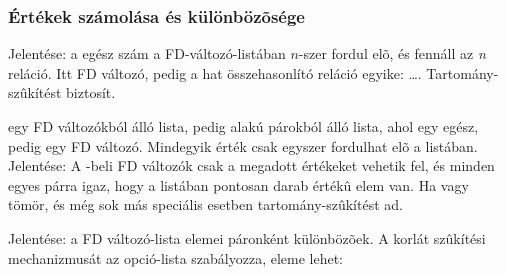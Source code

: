 \subsubsection{Értékek számolása és különbözõsége}

\medskip

{}

Jelentése: a  egész szám a  FD-változó-listában $n$-szer fordul elõ,
és fennáll az  {\it n}  reláció. Itt  FD változó,
 pedig a hat összehasonlító reláció egyike: \cd{\#=, \#\bs=, \#<} \ldots.
Tartomány-szûkítést biztosít.

\medskip

{}

 egy FD változókból álló lista,  pedig   alakú párokból
álló lista, ahol  egy egész,  pedig egy FD változó. Mindegyik 
érték csak egyszer fordulhat elõ a  listában. Jelentése: A -beli
FD változók csak a megadott  értékeket vehetik fel, és minden egyes 
párra igaz, hogy a  listában pontosan  darab  értékû elem van.
Ha  vagy  tömör, és még sok más speciális esetben tartomány-szûkítést
ad.

\medskip

\label{all_distinct}
{}

Jelentése: a  FD változó-lista elemei páronként különbözõek.  
A korlát szûkítési mechanizmusát az  opció-lista szabályozza,
eleme lehet:

